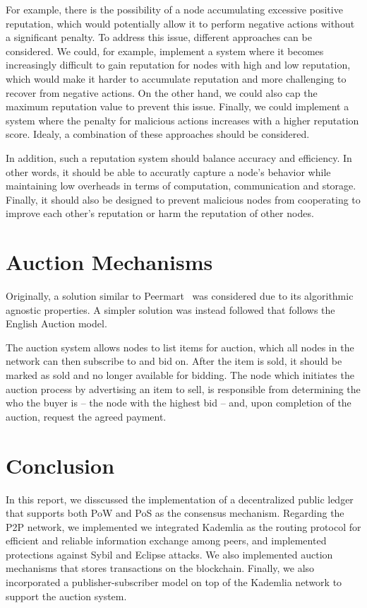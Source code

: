 \documentclass[a4paper, 11pt]{article}
\begin{document}
For example, there is the possibility of a node accumulating excessive positive reputation, which would potentially allow 
it to perform negative actions without a significant penalty. To address this issue, different approaches can be considered. We could,
for example, implement a system where it becomes increasingly difficult to gain reputation for nodes with high and low reputation, 
which would make it harder to accumulate reputation and more challenging to recover from negative actions. On the other
hand, we could also cap the maximum reputation value to prevent this issue. Finally, we could implement a system where 
the penalty for malicious actions increases with a higher reputation score. Idealy, a combination of these approaches
should be considered.

In addition, such a reputation system should balance accuracy and efficiency. In other words, it should be able to accuratly capture
a node's behavior while maintaining low overheads in terms of computation, communication and storage. Finally, it should also
be designed to prevent malicious nodes from cooperating to improve each other's reputation or harm the reputation of
other nodes.

\section{Auction Mechanisms}\label{sec:auction}

Originally, a solution similar to Peermart~\cite{hausheer2005peermart} was considered due to its algorithmic agnostic properties.
A simpler solution was instead followed that follows the English Auction model. 

The auction system allows nodes to list items for auction, which all nodes in the network can then subscribe to and bid on. 
After the item is sold, it should be marked as sold and no longer available for bidding.
The node which initiates the auction process by advertising an item to sell, is responsible from determining the who the
buyer is -- the node with the highest bid -- and, upon completion of the auction, request the agreed payment.

\section{Conclusion}\label{sec:concl}

In this report, we disscussed the implementation of a decentralized public ledger that supports both
\acs{PoW} and \acs{PoS} as the consensus mechanism. Regarding the \acs{P2P} network, we implemented 
we integrated Kademlia as the routing protocol for efficient and reliable information exchange among 
peers, and implemented protections against Sybil and Eclipse attacks.
We also implemented auction mechanisms that stores transactions on the blockchain. 
Finally, we also incorporated a publisher-subscriber model on top of the Kademlia network
to support the auction system.
\end{document}

